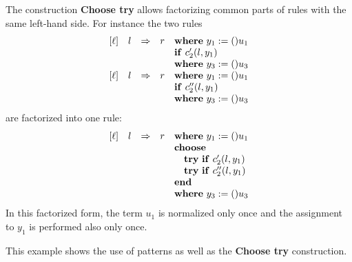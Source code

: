 The construction {\bf Choose try} allows factorizing common parts of 
rules with the same left-hand side.
For instance the two rules
$$ 
\begin{array}{llllllll}
& [\ell] & l & \Rightarrow & r & 
        {\bf where}\ y_1 := ()u_1  \\
&&&&&   {\bf if}\ c'_2(l,y_1) \\
&&&&&   {\bf where}\ y_3 := ()u_3  \\
& [\ell] & l & \Rightarrow & r & 
        {\bf where}\ y_1 := ()u_1 & \\
&&&&&   {\bf if}\ c''_2(l,y_1) \\
&&&&&   {\bf where}\ y_3 := ()u_3  
\end{array}
$$
are factorized into one rule:
$$ 
\begin{array}{llllllll}
& [\ell] & l & \Rightarrow & r & 
        {\bf where}\ y_1 := ()u_1 & \\
& & & & & {\bf choose} \\
& & & & & \quad
        {\bf try}\ {\bf if}\ c'_2(l,y_1) \\ 
& & & & & \quad
        {\bf try}\ {\bf if}\ c''_2(l,y_1) \\
& & & & & {\bf end} \\
&&&&&   {\bf where}\ y_3 := ()u_3  
\end{array}
$$
%
In this factorized form, the term $u_1$ is normalized only once
and the assignment to $y_1$ is performed also only once.

\EX

This example shows the use of patterns as well as the {\bf Choose try}
construction.



\FEX

